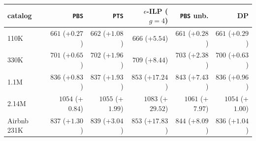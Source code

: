 \begin{tabular}{lrrrrr}
\toprule
catalog & \texttt{PBS} & \texttt{PTS} & $\epsilon$-ILP ($g{=}4$) & \texttt{PBS} unb. & DP \\
\midrule
110K & $661$ (+$0.27$) & $662$ (+$1.08$) & $666$ (+$5.54$) & $661$ (+$0.28$) & $661$ (+$0.29$) \\
330K & $701$ (+$0.65$) & $702$ (+$1.96$) & $709$ (+$8.44$) & $703$ (+$2.38$) & $700$ (+$0.63$) \\
1.1M & $836$ (+$0.83$) & $837$ (+$1.93$) & $853$ (+$17.24$) & $843$ (+$7.43$) & $836$ (+$0.96$) \\
2.14M & $1054$ (+$0.84$) & $1055$ (+$1.99$) & $1083$ (+$29.52$) & $1061$ (+$7.97$) & $1054$ (+$1.00$) \\
Airbnb 231K & $837$ (+$1.30$) & $839$ (+$3.04$) & $853$ (+$17.83$) & $844$ (+$8.09$) & $836$ (+$1.04$) \\
\bottomrule
\end{tabular}
